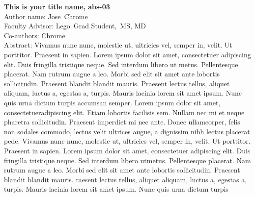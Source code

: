 \documentclass[float=false, crop=false]{standalone}
\begin{document}
\textbf{This is your title name, abs-03}\\\noindent
Author name: Jose~Chrome \\\noindent
Faculty Advisor: Lego~Grad Student,~MS, MD\\\noindent
Co-authors: Chrome \\\noindent
Abstract: Vivamus nunc nunc, molestie ut, ultricies vel, semper in, velit. Ut porttitor. Praesent in sapien. Lorem ipsum dolor sit amet, consectetuer adipiscing elit. Duis fringilla tristique neque. Sed interdum libero ut metus. Pellentesque placerat. Nam rutrum augue a leo. Morbi sed elit sit amet ante lobortis sollicitudin. Praesent blandit blandit mauris. Praesent lectus tellus, aliquet aliquam, luctus a, egestas a, turpis. Mauris lacinia lorem sit amet ipsum. Nunc quis urna dictum turpis accumsan semper. Lorem ipsum dolor sit amet, consectetueradipiscing elit. Etiam lobortis facilisis sem. Nullam nec mi et neque pharetra sollicitudin. Praesent imperdiet mi nec ante. Donec ullamcorper, felis non sodales commodo, lectus velit ultrices augue, a dignissim nibh lectus placerat pede. Vivamus nunc nunc, molestie ut, ultricies vel, semper in, velit. Ut porttitor. Praesent in sapien. Lorem ipsum dolor sit amet, consectetuer adipiscing elit. Duis fringilla tristique neque. Sed interdum libero utmetus. Pellentesque placerat. Nam rutrum augue a leo. Morbi sed elit sit amet ante lobortis sollicitudin. Praesent blandit blandit mauris. raesent lectus tellus, aliquet aliquam, luctus a, egestas a, turpis. Mauris lacinia lorem sit amet ipsum. Nunc quis urna dictum turpis\\\newline
\end{document}

